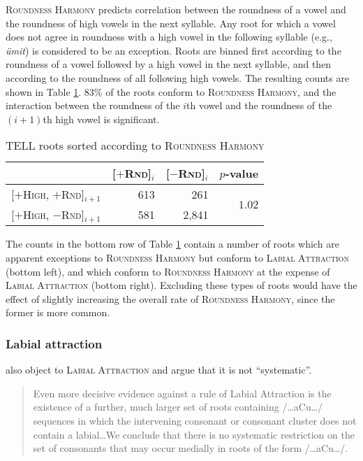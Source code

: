 \textsc{Roundness Harmony} predicts correlation between the roundness of a vowel and the roundness of high vowels in the next syllable. 
Any root for which a vowel does not agree in roundness with a high vowel in the following syllable (e.g., \emph{ümit}) is considered to be an exception. 
Roots are binned first according to the roundness of a vowel followed by a high vowel in the next syllable, and then according to the roundness of all following high vowels.
The resulting counts are shown in Table \ref{rhs}. 
83\% of the roots conform to \textsc{Roundness Harmony}, and the interaction between the roundness of the $i$th vowel and the roundness of the $(i +1)$th high vowel is significant.

\begin{table}[t]
\centering
\begin{tabular}{lrrr}
\toprule
                                              & [$+$\textsc{Rnd}]$_i$ & [$-$\textsc{Rnd}]$_i$ & $p$-value                      \\
\midrule
\buf{}[$+$\textsc{High}, $+$\textsc{Rnd}]$_{i+1}$ & 613                   &   261                 & \multirow{2}{*}{$1.02$\e{-36}} \\
\buf{}[$+$\textsc{High}, $-$\textsc{Rnd}]$_{i+1}$ & 581                   & 2,841                                                  \\
\bottomrule
\end{tabular}
\caption{TELL roots sorted according to \textsc{Roundness Harmony}}
\label{rhs}
\end{table}

\noindent
The counts in the bottom row of Table \ref{rhs} contain a number of roots which are apparent exceptions to \textsc{Roundness Harmony} but conform to \textsc{Labial Attraction} (bottom left), and which conform to \textsc{Roundness Harmony} at the expense of \textsc{Labial Attraction} (bottom right). Excluding these types of roots would have the effect of slightly increasing the overall rate of \textsc{Roundness Harmony}, since the former is more common.

\subsubsection{Labial attraction}

\citet{Clements1982} also object to \textsc{Labial Attraction} and argue that it is not ``systematic''.

\begin{quote}
Even more decisive evidence against a rule of Labial Attraction is the existence of a further, much larger set of roots containing /\ldots{}aCu\ldots/ sequences in which the intervening consonant or consonant cluster does not contain a labial\ldots{}We conclude that there is no systematic restriction on the set of consonants that may occur medially in roots of the form /\ldots{}aCu\ldots/. \citep[225]{Clements1982}
\end{quote}

